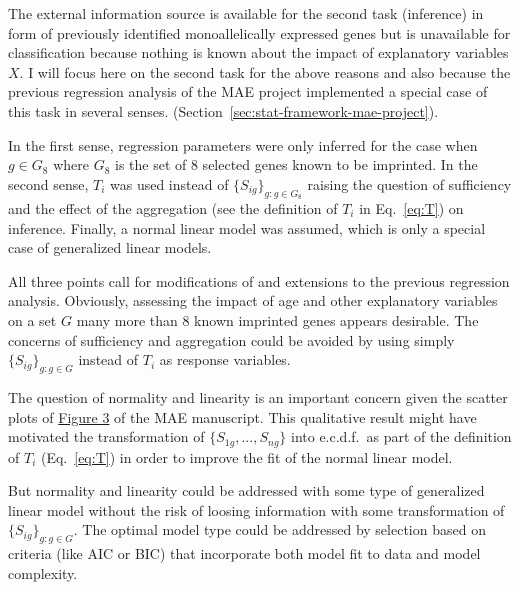 \documentclass[letterpaper]{article}
\begin{document}
The external information source is available for the second task (inference)
in form of previously identified monoallelically expressed genes but is
unavailable for classification because nothing is known about the impact of
explanatory variables \(X\).  I will focus here on the second task for the
above reasons and also because the previous regression analysis of the MAE
project implemented a special case of this task in several senses.
(Section~\ref{sec:stat-framework-mae-project}).

In the first sense, regression parameters were only inferred for the case when
\(g\in G_8\) where \(G_8\) is the set of 8 selected genes known to be
imprinted.  In the second sense, \(T_i\) was used instead of
\(\{S_{ig}\}_{g:g\in G_8}\) raising the question of sufficiency and the effect
of the aggregation (see the definition of \(T_i\) in Eq.~\ref{eq:T}) on
inference.  Finally, a normal linear model was assumed, which is only a special
case of generalized linear models.

All three points call for modifications of and extensions to the previous
regression analysis.  Obviously, assessing the impact of age and other
explanatory variables on a set \(G\) many more than 8 known imprinted genes
appears desirable.  The concerns of sufficiency and aggregation could be avoided by
using simply \(\{S_{ig}\}_{g:g\in G}\) instead of \(T_i\) as response variables.

The question of normality and linearity is an important concern given the
scatter plots of
\href{https://docs.google.com/presentation/d/1YvpA1AJ-zzir1Iw0F25tO9x8gkSAzqaO4fjB7K3zBhE/edit?usp=sharing}{Figure
3} of the MAE manuscript.  This qualitative result might have motivated the
transformation of \(\{S_{1g},...,S_{ng}\}\) into e.c.d.f.~as part
of the definition of \(T_i\) (Eq.~\ref{eq:T}) in order to improve the fit of
the normal linear model.

But normality and linearity could be addressed with some type of generalized
linear model without the risk of loosing information with some transformation
of \(\{S_{ig}\}_{g:g\in G}\).  The optimal model type could be addressed by
selection based on criteria (like AIC or BIC) that incorporate both model fit
to data and model complexity.


\end{document}
